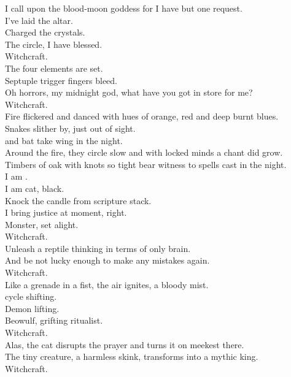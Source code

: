 I call upon the blood-moon goddess for I have but one request. \\
I've laid the altar. \\
Charged the crystals. \\
The circle, I have blessed. \\
Witchcraft. \\
The four elements are set. \\
Septuple trigger fingers bleed. \\
Oh horrors, my midnight god, what have you got in store for me? \\
Witchcraft. \\

Fire flickered and danced with hues of orange, red and deep burnt blues. \\
Snakes slither by, just out of sight. \\
 and bat take wing in the night. \\
Around the fire, they circle slow and with locked minds a chant did grow. \\
Timbers of oak with knots so tight bear witness to spells cast in the night. \\

I am . \\
I am cat, black. \\
Knock the candle from scripture stack. \\
I bring justice at moment, right. \\
 Monster, set alight. \\
Witchcraft. \\
Unleash a reptile thinking in terms of only  brain. \\
And be not lucky enough to make any mistakes again. \\
Witchcraft. \\
Like a grenade in a fist, the air ignites, a bloody mist. \\
 cycle shifting. \\
Demon lifting. \\
Beowulf, grifting ritualist. \\
Witchcraft. \\
Alas, the cat disrupts the prayer and turns it on meekest there. \\
The tiny creature, a harmless skink, transforms into a mythic king. \\
Witchcraft. \\

